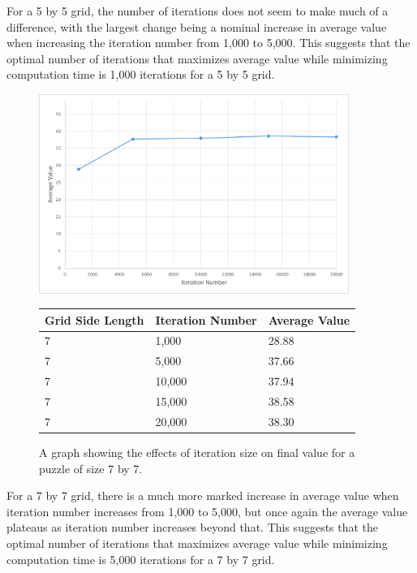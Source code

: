 \documentclass[12pt]{article}
\begin{document}
For a 5 by 5 grid, the number of iterations does not seem to make much of a difference, with the largest change being a nominal increase in average value when increasing the iteration number from 1,000 to 5,000. This suggests that the optimal number of iterations that maximizes average value while minimizing computation time is 1,000 iterations for a 5 by 5 grid.

\begin{figure}[H]
    \centering
    \includegraphics[width=0.9\textwidth]{hill_climbing_7x7_iterations_excel}
\begin{tabular}{ |p{4cm}||p{4cm}|p{4cm}|  }
 \hline
Grid Side Length& Iteration Number &Average Value\\
 \hline
7&1,000&28.88\\
7&5,000&37.66\\
7&10,000&37.94\\
7&15,000&38.58\\
7&20,000&38.30\\
 \hline
\end{tabular}
    \caption{A graph showing the effects of iteration size on final value for a puzzle of size 7 by 7.}
    \label{fig:hill_climbing_7x7_iterations}
\end{figure}

For a 7 by 7 grid, there is a much more marked increase in average value when iteration number increases from 1,000 to 5,000, but once again the average value plateaus as iteration number increases beyond that. This suggests that the optimal number of iterations that maximizes average value while minimizing computation time is 5,000 iterations for a 7 by 7 grid.
\end{document}
